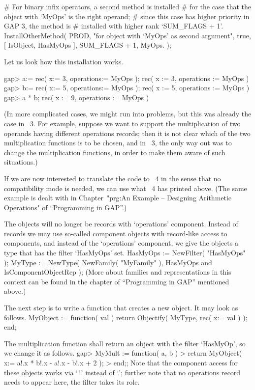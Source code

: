 # For binary infix operators, a second method is installed
# for the case that the object with `MyOps' is the right operand;
# since this case has higher priority in GAP 3, the method is
# installed with higher rank `SUM_FLAGS + 1'.
InstallOtherMethod( PROD,
    "for object with `MyOps' as second argument",
    true,
    [ IsObject, HasMyOps ], SUM_FLAGS + 1,
    MyOps.\* );
\endtt

Let us look how this installation works.

\begintt
gap> a:= rec( x:= 3, operations:= MyOps );
rec( x := 3, operations := MyOps )
gap> b:= rec( x:= 5, operations:= MyOps );
rec( x := 5, operations := MyOps )
gap> a * b;
rec( x := 9, operations := MyOps )
\endtt

(In more complicated cases, we might run into problems, but this was
already the case in {\GAP}~3.  For example, suppose we want to support
the multiplication of two operands having different operations
records; then it is not clear which of the two multiplication
functions is to be chosen, and in {\GAP}~3, the only way out was to
change the multiplication functions, in order to make them aware of
such situations.)

If we are now interested to translate the code to {\GAP}~4 in the
sense that no compatibility mode is needed, we can use what {\GAP}~4
has printed above.  (The same example is dealt with in Chapter~"prg:An
Example -- Designing Arithmetic Operations" of ``Programming in
GAP''.)

The objects will no longer be records with `operations' component.
Instead of records we may use so-called component objects
with record-like access to components, 
and instead of the `operations' component, we give the objects a
type that has the filter `HasMyOps' set.
\begintt
HasMyOps := NewFilter( "HasMyOps" );
MyType := NewType( NewFamily( "MyFamily" ),
                   HasMyOps and IsComponentObjectRep );
\endtt
(More about families and representations in this context can be found
in the chapter of ``Programming in GAP'' mentioned above.)

The next step is to write a function that creates a new object.
It may look as follows.
\begintt
MyObject := function( val )
    return Objectify( MyType, rec( x:= val ) );
end;
\endtt

The multiplication function shall return an object with the
filter `HasMyOp', so we change it as follows.
\begintt
gap> MyMult := function( a, b )                          
>        return MyObject( x:= a!.x * b!.x - a!.x - b!.x + 2 );
>    end;; 
\endtt
Note that the component access for these objects
works via `!.' instead of `.';
further note that no operations record needs to appear here,
the filter takes its role.


